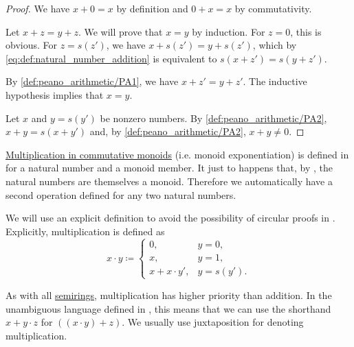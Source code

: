 \begin{proof}
   We have \( x + 0 = x \) by definition and \( 0 + x = x \) by commutativity.

   Let \( x + z = y + z \). We will prove that \( x = y \) by induction. For \( z = 0 \), this is obvious. For \( z = s(z') \), we have \( x + s(z') = y + s(z') \), which by \eqref{eq:def:natural_number_addition} is equivalent to \( s(x + z') = s(y + z') \).

  By \ref{def:peano_arithmetic/PA1}, we have \( x + z' = y + z' \). The inductive hypothesis implies that \( x = y \).

   Let \( x \) and \( y = s(y') \) be nonzero numbers. By \ref{def:peano_arithmetic/PA2}, \( x + y = s(x + y') \) and, by \ref{def:peano_arithmetic/PA2}, \( x + y \neq 0 \).
\end{proof}

\begin{definition}\label{def:natural_number_multiplication}
  \hyperref[rem:additive_magma/multiplication]{Multiplication in commutative monoids} (i.e. monoid exponentiation) is defined in  for a natural number and a monoid member. It just to happens that, by , the natural numbers are themselves a monoid. Therefore we automatically have a second  operation defined for any two natural numbers.

  We will use an explicit definition to avoid the possibility of circular proofs in . Explicitly, multiplication is defined as
  \begin{equation}\label{eq:def:natural_number_multiplication}
    x \cdot y \coloneqq \begin{cases}
      0,              &y = 0,     \\
      x,              &y = 1,     \\
      x + x \cdot y', &y = s(y').
    \end{cases}
  \end{equation}

  As with all \hyperref[def:semiring]{semirings}, multiplication has higher priority than addition. In the unambiguous language defined in , this means that we can use the shorthand \( x + y \cdot z \) for \( ((x \cdot y) + z) \). We usually use juxtaposition for denoting multiplication.
\end{definition}

